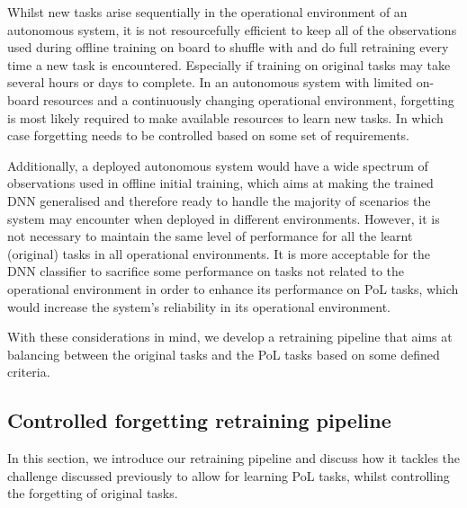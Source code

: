 Whilst new tasks arise sequentially in the operational environment of
an autonomous system, it is not resourcefully efficient to keep all of the observations used during offline training on board to shuffle with and do full retraining every time a new task is encountered. Especially if training on original tasks may take several hours or days to complete.
%
In an autonomous system with limited on-board resources and a continuously changing operational environment, forgetting is most likely required to make available resources to learn new tasks.
%
In which case forgetting needs to be controlled based on some set of requirements.

Additionally, a deployed autonomous system would have a wide spectrum of observations used in offline initial training, which aims at making the trained DNN generalised and therefore ready to handle the majority of scenarios the system may encounter when deployed in different environments. 
%
However, it is not necessary to maintain the same level of performance for all the learnt (original) tasks in all operational environments. 
%
%
It is more acceptable for the DNN classifier to sacrifice some performance on tasks not related to the operational environment in order to enhance its performance on PoL tasks, which would increase the system's reliability in its operational environment.

With these considerations in mind, we develop a retraining pipeline that aims at balancing between the original tasks and the PoL tasks based on some defined criteria.


\subsection{Controlled forgetting retraining pipeline}
In this section, we introduce our retraining pipeline and discuss how it tackles the challenge discussed previously to allow for learning PoL tasks, whilst controlling the forgetting of original tasks.

